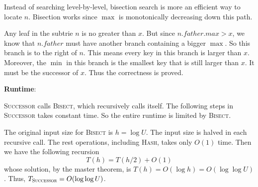 \documentclass{article}
\begin{document}
Instead of searching level-by-level, bisection search is more an efficient way to locate $n$. Bisection works since $\max$ is monotonically decreasing down this path.

Any leaf in the subtrie $n$ is no greater than $x$. But since $n.father.max>x$, we know that $n.father$ must have another branch containing a bigger $\max$. So this branch is to the right of $n$. This means every key in this branch is larger than $x$. Moreover, the $\min$ in this branch is the smallest key that is still larger than $x$. It must be the successor of $x$. Thus the correctness is proved. 

\noindent\textbf{Runtime}:

\textsc{Successor} calls \textsc{Bisect}, which recursively calls itself. The following steps in \textsc{Successor} takes constant time. So the entire runtime is limited by \textsc{Bisect}.

The original input size for \textsc{Bisect} is $h=\log U$. The input size is halved in each recursive call. The rest operations, including \textsc{Hash}, takes only $O(1)$ time. Then we have the following recursion
\begin{equation*}
T(h)=T(h/2)+O(1)
\end{equation*}
whose solution, by the master theorem, is $T(h)=O(\log h)=O(\log\log U)$. Thus, $T_{\textsc{Successor}}=O(\log\log U)$.
\end{document}
